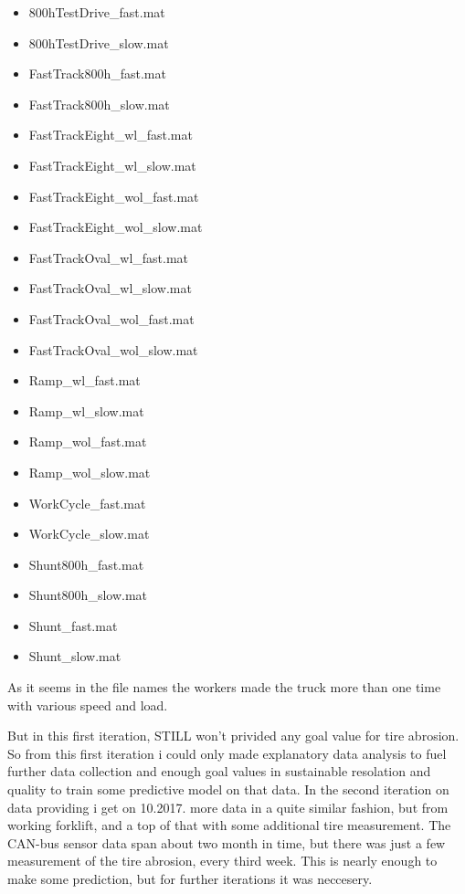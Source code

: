 \begin{itemize}[noitemsep]
    \item {800hTestDrive\_fast.mat}
    \item {800hTestDrive\_slow.mat}
    \item {FastTrack800h\_fast.mat}
 	\item {FastTrack800h\_slow.mat}
	\item {FastTrackEight\_wl\_fast.mat}
	\item {FastTrackEight\_wl\_slow.mat}
	\item {FastTrackEight\_wol\_fast.mat}
	\item {FastTrackEight\_wol\_slow.mat}
  	\item {FastTrackOval\_wl\_fast.mat}
	\item {FastTrackOval\_wl\_slow.mat}
	\item {FastTrackOval\_wol\_fast.mat}
	\item {FastTrackOval\_wol\_slow.mat}
	\item {Ramp\_wl\_fast.mat} 
	\item {Ramp\_wl\_slow.mat}
	\item {Ramp\_wol\_fast.mat}
	\item {Ramp\_wol\_slow.mat}
    \item {WorkCycle\_fast.mat}
    \item {WorkCycle\_slow.mat}
	\item {Shunt800h\_fast.mat}  	
  	\item {Shunt800h\_slow.mat}	
 	\item {Shunt\_fast.mat} 	
 	\item {Shunt\_slow.mat}
\end{itemize}

				\noindent
As it seems in the file names the workers made the truck more than one time with various speed and load.

But in this first iteration, STILL won't privided any goal value for tire abrosion. So from this first iteration i could only made explanatory data analysis to fuel further data collection and enough goal values in sustainable resolation and quality to train some predictive model on that data.
				\noindent
In the second iteration on data providing i get on 10.2017. more data in a quite similar fashion, but from working forklift, and a top of that with some additional tire measurement. The CAN-bus sensor data span about two month in time, but there was just a few measurement of the tire abrosion, every third week. This is nearly enough to make some prediction, but for further iterations it was neccesery.

